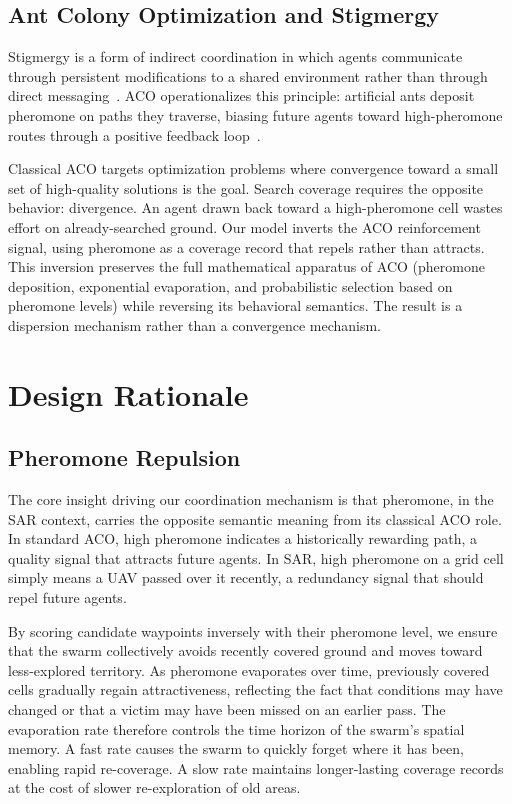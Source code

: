 \documentclass[10pt,a4paper,twocolumn]{article}
\begin{document}
\subsection{Ant Colony Optimization and Stigmergy}

Stigmergy is a form of indirect coordination in which agents communicate through persistent modifications to a shared environment rather than through direct messaging~\citep{bk:Bonabeau1999}. ACO operationalizes this principle: artificial ants deposit pheromone on paths they traverse, biasing future agents toward high-pheromone routes through a positive feedback loop~\citep{bk:Dorigo2004}.

Classical ACO targets optimization problems where convergence toward a small set of high-quality solutions is the goal. Search coverage requires the opposite behavior: divergence. An agent drawn back toward a high-pheromone cell wastes effort on already-searched ground. Our model inverts the ACO reinforcement signal, using pheromone as a coverage record that repels rather than attracts. This inversion preserves the full mathematical apparatus of ACO (pheromone deposition, exponential evaporation, and probabilistic selection based on pheromone levels) while reversing its behavioral semantics. The result is a dispersion mechanism rather than a convergence mechanism.

\section{Design Rationale}

\subsection{Pheromone Repulsion}

The core insight driving our coordination mechanism is that pheromone, in the SAR context, carries the opposite semantic meaning from its classical ACO role. In standard ACO, high pheromone indicates a historically rewarding path, a quality signal that attracts future agents. In SAR, high pheromone on a grid cell simply means a UAV passed over it recently, a redundancy signal that should repel future agents.

By scoring candidate waypoints inversely with their pheromone level, we ensure that the swarm collectively avoids recently covered ground and moves toward less-explored territory. As pheromone evaporates over time, previously covered cells gradually regain attractiveness, reflecting the fact that conditions may have changed or that a victim may have been missed on an earlier pass. The evaporation rate therefore controls the time horizon of the swarm's spatial memory. A fast rate causes the swarm to quickly forget where it has been, enabling rapid re-coverage. A slow rate maintains longer-lasting coverage records at the cost of slower re-exploration of old areas.
\end{document}
